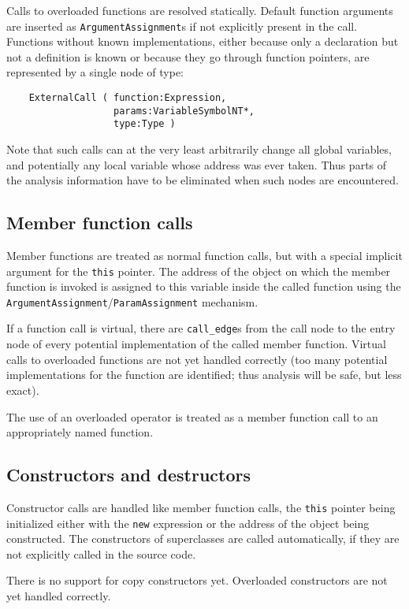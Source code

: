 Calls to overloaded functions are resolved statically. Default
function arguments are inserted as \verb|ArgumentAssignment|s if not
explicitly present in the call. Functions without known
implementations, either because only a declaration but not a
definition is known or because they go through function pointers,
are represented by a single node of type:
\begin{verbatim}
    ExternalCall ( function:Expression, 
                   params:VariableSymbolNT*, 
                   type:Type )
\end{verbatim}
Note that such calls can at the very least arbitrarily change all
global variables, and potentially any local variable whose address
was ever taken. Thus parts of the analysis information have to be
eliminated when such nodes are encountered.

\subsection{Member function calls}

Member functions are treated as normal function calls, but with a
special implicit argument for the \lstinline|this| pointer. The
address of the object on which the member function is invoked is
assigned to this variable inside the called function using the
\verb|ArgumentAssignment|/\verb|ParamAssignment| mechanism.

If a function call is virtual, there are \verb|call_edge|s from the
call node to the entry node of every potential implementation of
the called member function. Virtual calls to overloaded functions
are not yet handled correctly (too many potential implementations
for the function are identified; thus analysis will be safe, but
less exact).

The use of an overloaded operator is treated as a member function
call to an appropriately named function.

\subsection{Constructors and destructors}

Constructor calls are handled like member function calls, the
\lstinline|this| pointer being initialized either with the
\lstinline|new| expression or the address of the object being
constructed. The constructors of superclasses are called
automatically, if they are not explicitly called in the source code.

There is no support for copy constructors yet. Overloaded
constructors are not yet handled correctly.

